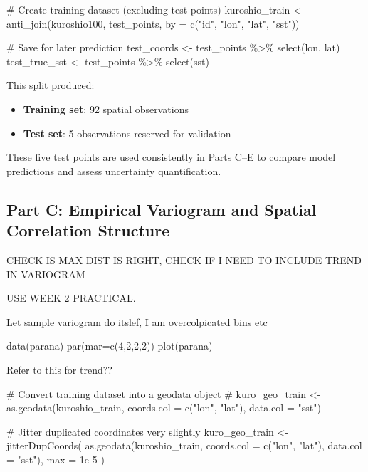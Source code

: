 \documentclass[
  11pt,
]{article}
\newenvironment{Shaded}{\begin{snugshade}}{\end{snugshade}}
\newcommand{\AttributeTok}[1]{\textcolor[rgb]{0.40,0.45,0.13}{#1}}
\newcommand{\CommentTok}[1]{\textcolor[rgb]{0.37,0.37,0.37}{#1}}
\newcommand{\FloatTok}[1]{\textcolor[rgb]{0.68,0.00,0.00}{#1}}
\newcommand{\FunctionTok}[1]{\textcolor[rgb]{0.28,0.35,0.67}{#1}}
\newcommand{\NormalTok}[1]{\textcolor[rgb]{0.00,0.23,0.31}{#1}}
\newcommand{\OtherTok}[1]{\textcolor[rgb]{0.00,0.23,0.31}{#1}}
\newcommand{\SpecialCharTok}[1]{\textcolor[rgb]{0.37,0.37,0.37}{#1}}
\newcommand{\StringTok}[1]{\textcolor[rgb]{0.13,0.47,0.30}{#1}}
\begin{document}
\begin{Shaded}
\begin{Highlighting}[]
\CommentTok{\# Create training dataset (excluding test points)}
\NormalTok{kuroshio\_train }\OtherTok{\textless{}{-}} \FunctionTok{anti\_join}\NormalTok{(kuroshio100, test\_points, }\AttributeTok{by =} \FunctionTok{c}\NormalTok{(}\StringTok{"id"}\NormalTok{, }\StringTok{"lon"}\NormalTok{, }\StringTok{"lat"}\NormalTok{, }\StringTok{"sst"}\NormalTok{))}

\CommentTok{\# Save for later prediction}
\NormalTok{test\_coords }\OtherTok{\textless{}{-}}\NormalTok{ test\_points }\SpecialCharTok{\%\textgreater{}\%} \FunctionTok{select}\NormalTok{(lon, lat)}
\NormalTok{test\_true\_sst }\OtherTok{\textless{}{-}}\NormalTok{ test\_points }\SpecialCharTok{\%\textgreater{}\%} \FunctionTok{select}\NormalTok{(sst)}
\end{Highlighting}
\end{Shaded}

This split produced:

\begin{itemize}
\item
  \textbf{Training set}: 92 spatial observations
\item
  \textbf{Test set}: 5 observations reserved for validation
\end{itemize}

These five test points are used consistently in Parts C--E to compare
model predictions and assess uncertainty quantification.

\subsection{Part C: Empirical Variogram and Spatial Correlation
Structure}\label{part-c-empirical-variogram-and-spatial-correlation-structure}

CHECK IS MAX DIST IS RIGHT, CHECK IF I NEED TO INCLUDE TREND IN
VARIOGRAM

USE WEEK 2 PRACTICAL.

Let sample variogram do itslef, I am overcolpicated bins etc

data(parana) par(mar=c(4,2,2,2)) plot(parana)

Refer to this for trend??\\

\begin{Shaded}
\begin{Highlighting}[]
\CommentTok{\# Convert training dataset into a geodata object}
\CommentTok{\# kuro\_geo\_train \textless{}{-} as.geodata(kuroshio\_train, coords.col = c("lon", "lat"), data.col = "sst")}

\CommentTok{\# Jitter duplicated coordinates very slightly}
\NormalTok{kuro\_geo\_train }\OtherTok{\textless{}{-}} \FunctionTok{jitterDupCoords}\NormalTok{(}
  \FunctionTok{as.geodata}\NormalTok{(kuroshio\_train, }\AttributeTok{coords.col =} \FunctionTok{c}\NormalTok{(}\StringTok{"lon"}\NormalTok{, }\StringTok{"lat"}\NormalTok{), }\AttributeTok{data.col =} \StringTok{"sst"}\NormalTok{),}
  \AttributeTok{max =} \FloatTok{1e{-}5}
\NormalTok{)}
\end{Highlighting}
\end{Shaded}
\end{document}
